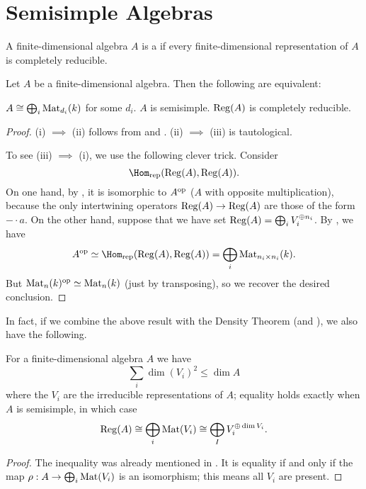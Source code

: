 \section{Semisimple Algebras}

\begin{definition}
	A finite-dimensional algebra $A$ is a 
	if every finite-dimensional representation of $A$ is completely reducible.
\end{definition}

\begin{theorem}
	Let $A$ be a finite-dimensional algebra.
	Then the following are equivalent:
	\begin{enumerate}[(i)]
		\ii $A \cong \bigoplus_i \mathrm{Mat}_{d_i}(k)$ for some $d_i$.
		\ii $A$ is semisimple.
		\ii $\operatorname{Reg}(A)$ is completely reducible.
	\end{enumerate}
\end{theorem}
\begin{proof}
	(i) $\implies$ (ii) follows
	from  and .
	(ii) $\implies$ (iii) is tautological.

	To see (iii) $\implies$ (i), we use the following clever trick.
	Consider
	\[ \Homrep(\Reg(A), \Reg(A)). \]
	On one hand, by ,
	it is isomorphic to $A^{\mathrm{op}}$ ($A$ with opposite multiplication),
	because the only intertwining operators $\operatorname{Reg}(A) \to \operatorname{Reg}(A)$
	are those of the form $- \cdot a$.
	On the other hand, suppose that we have set
	$ \operatorname{Reg}(A) = \bigoplus_i V_i^{\oplus n_i} $.
	By , we have
	\[ A\op \simeq \Homrep(\Reg(A), \Reg(A))
		= \bigoplus_i \Mat_{n_i \times n_i}(k). \]
	But $\mathrm{Mat}_n(k)^{\mathrm{op}} \simeq \mathrm{Mat}_n(k)$ (just by transposing),
	so we recover the desired conclusion.
\end{proof}

In fact, if we combine the above result with
the Density Theorem (and ), we also have the following.
\begin{theorem}
	For a finite-dimensional algebra $A$ we have
	\[ \sum_{i} \dim(V_i)^2 \le \dim A \]
	where the $V_i$ are the irreducible representations of $A$;
	equality holds exactly when $A$ is semisimple,
	in which case 
	\[ \operatorname{Reg}(A) \cong \bigoplus_i \mathrm{Mat}(V_i)
		\cong \bigoplus_I V_i^{\oplus \dim V_i}. \]
\end{theorem}
\begin{proof}
	The inequality was already mentioned in .
	It is equality if and only if the map $\rho : A \to \bigoplus_i \mathrm{Mat}(V_i)$
	is an isomorphism; this means all $V_i$ are present.
\end{proof}

